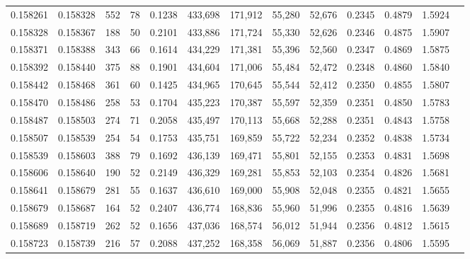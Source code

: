 \begin{tabular}{rrrrrrrrrrrrr}
0.158261 & 0.158328 &   552 &  78 &                                     0.1238 & 433,698 & 171,912 &  55,280 &  52,676 & 0.2345 & 0.4879 & 1.5924 \\
0.158328 & 0.158367 &   188 &  50 &                                     0.2101 & 433,886 & 171,724 &  55,330 &  52,626 & 0.2346 & 0.4875 & 1.5907 \\
0.158371 & 0.158388 &   343 &  66 &                                     0.1614 & 434,229 & 171,381 &  55,396 &  52,560 & 0.2347 & 0.4869 & 1.5875 \\
0.158392 & 0.158440 &   375 &  88 &                                     0.1901 & 434,604 & 171,006 &  55,484 &  52,472 & 0.2348 & 0.4860 & 1.5840 \\
0.158442 & 0.158468 &   361 &  60 &                                     0.1425 & 434,965 & 170,645 &  55,544 &  52,412 & 0.2350 & 0.4855 & 1.5807 \\
0.158470 & 0.158486 &   258 &  53 &                                     0.1704 & 435,223 & 170,387 &  55,597 &  52,359 & 0.2351 & 0.4850 & 1.5783 \\
0.158487 & 0.158503 &   274 &  71 &                                     0.2058 & 435,497 & 170,113 &  55,668 &  52,288 & 0.2351 & 0.4843 & 1.5758 \\
0.158507 & 0.158539 &   254 &  54 &                                     0.1753 & 435,751 & 169,859 &  55,722 &  52,234 & 0.2352 & 0.4838 & 1.5734 \\
0.158539 & 0.158603 &   388 &  79 &                                     0.1692 & 436,139 & 169,471 &  55,801 &  52,155 & 0.2353 & 0.4831 & 1.5698 \\
0.158606 & 0.158640 &   190 &  52 &                                     0.2149 & 436,329 & 169,281 &  55,853 &  52,103 & 0.2354 & 0.4826 & 1.5681 \\
0.158641 & 0.158679 &   281 &  55 &                                     0.1637 & 436,610 & 169,000 &  55,908 &  52,048 & 0.2355 & 0.4821 & 1.5655 \\
0.158679 & 0.158687 &   164 &  52 &                                     0.2407 & 436,774 & 168,836 &  55,960 &  51,996 & 0.2355 & 0.4816 & 1.5639 \\
0.158689 & 0.158719 &   262 &  52 &                                     0.1656 & 437,036 & 168,574 &  56,012 &  51,944 & 0.2356 & 0.4812 & 1.5615 \\
0.158723 & 0.158739 &   216 &  57 &                                     0.2088 & 437,252 & 168,358 &  56,069 &  51,887 & 0.2356 & 0.4806 & 1.5595 \\

\end{tabular}
